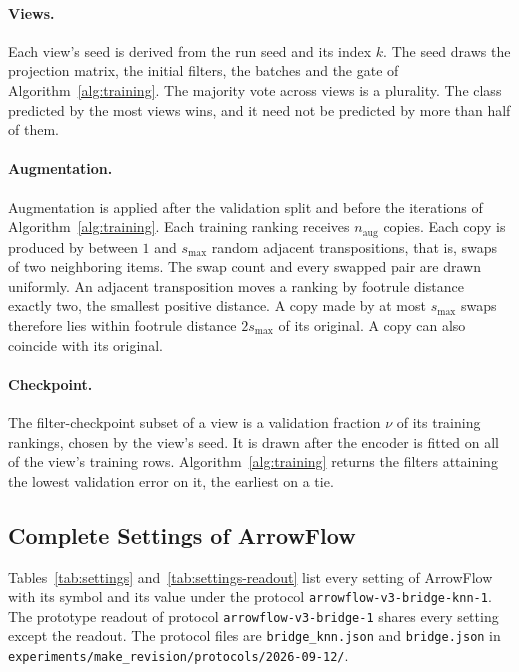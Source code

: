 \paragraph{Views.} Each view's seed is derived from the run seed and its index $k$. The seed draws the projection matrix, the initial filters, the batches and the gate of Algorithm~\ref{alg:training}. The majority vote across views is a plurality. The class predicted by the most views wins, and it need not be predicted by more than half of them.

\paragraph{Augmentation.} Augmentation is applied after the validation split and before the iterations of Algorithm~\ref{alg:training}. Each training ranking receives $n_{\mathrm{aug}}$ copies. Each copy is produced by between $1$ and $s_{\max}$ random adjacent transpositions, that is, swaps of two neighboring items. The swap count and every swapped pair are drawn uniformly. An adjacent transposition moves a ranking by footrule distance exactly two, the smallest positive distance. A copy made by at most $s_{\max}$ swaps therefore lies within footrule distance $2s_{\max}$ of its original. A copy can also coincide with its original.

\paragraph{Checkpoint.} The filter-checkpoint subset of a view is a validation fraction $\nu$ of its training rankings, chosen by the view's seed. It is drawn after the encoder is fitted on all of the view's training rows. Algorithm~\ref{alg:training} returns the filters attaining the lowest validation error on it, the earliest on a tie.

\subsection{Complete Settings of ArrowFlow}\label{supp:settings}

{\raggedright Tables~\ref{tab:settings} and~\ref{tab:settings-readout} list every setting of ArrowFlow with its symbol and its value under the protocol \texttt{arrowflow-v3-bridge-knn-1}. The prototype readout of protocol \texttt{arrowflow-v3-bridge-1} shares every setting except the readout. The protocol files are \texttt{bridge\_knn.json} and \texttt{bridge.json} in \texttt{experiments/make\_revision/}\allowbreak\texttt{protocols/2026-09-12/}.\par}


